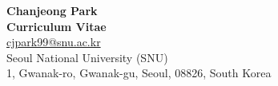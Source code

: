 \documentclass[a4paper,10pt]{extarticle}
\begin{document}
\pagestyle{empty}

\begin{center}
\textbf{\LARGE Chanjeong Park }\\[6pt] %
\textbf{\large Curriculum Vitae}\\[6pt]

\href{mailto:cjpark99@snu.ac.kr}{cjpark99@snu.ac.kr}\\
Seoul National University (SNU)\\
1, Gwanak-ro, Gwanak-gu, Seoul, 08826, South Korea\\
\end{center}



















\end{document}
